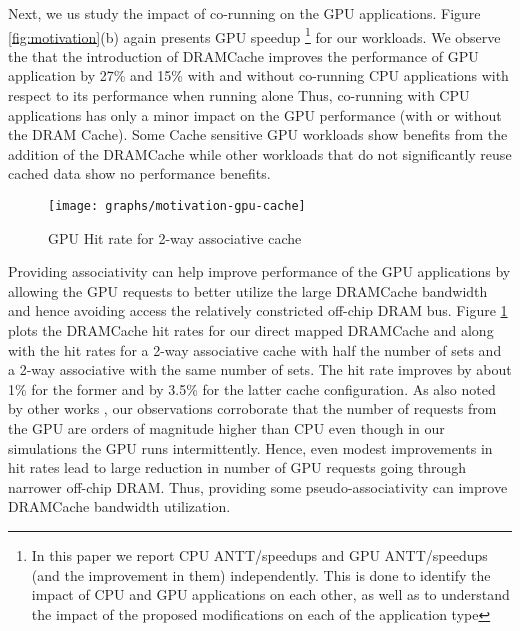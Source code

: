 \par Next, we us study the impact of co-running on the GPU applications.  Figure \ref{fig:motivation}(b) again presents GPU speedup \footnote{In this 
paper we report CPU ANTT/speedups and GPU ANTT/speedups (and the improvement in them) independently. This is done to identify the impact of CPU 
and GPU applications on each other, as well as to understand the impact of the proposed modifications on each of the application
type} 
for our workloads. 
We observe the that the introduction of DRAMCache improves the performance of GPU application by 27\% and 15\% with and without co-running CPU applications with respect to its performance when running alone
Thus,  co-running with CPU applications has only a minor impact on the GPU performance (with or without the DRAM Cache). 
Some Cache sensitive GPU workloads show benefits from the addition of the DRAMCache while other workloads that do not significantly reuse cached data show no performance benefits.
\begin{figure}[htbp]
   \texttt{[image: graphs/motivation-gpu-cache]}
   \caption{GPU Hit rate for 2-way associative cache}
   \label{fig:motivation-gpu-cache}
\end{figure}
Providing associativity can help improve performance of the GPU applications by allowing the GPU requests to better utilize the large  DRAMCache bandwidth and hence avoiding access the relatively constricted off-chip DRAM bus. Figure \ref{fig:motivation-gpu-cache} plots the DRAMCache hit rates for our direct mapped DRAMCache and along with the hit rates for a 2-way associative cache with half the number of sets and a 2-way associative with the same number of sets. The hit rate improves by about 1\% for the former and by 3.5\% for the latter cache configuration. As also noted by other works \cite{oscar}, our observations corroborate that the number of requests from the GPU are orders of magnitude higher than CPU even though in our simulations the GPU runs intermittently. Hence, even modest improvements in hit rates lead to large reduction in number of GPU requests going through narrower off-chip DRAM. Thus, providing some pseudo-associativity can improve DRAMCache bandwidth utilization.


